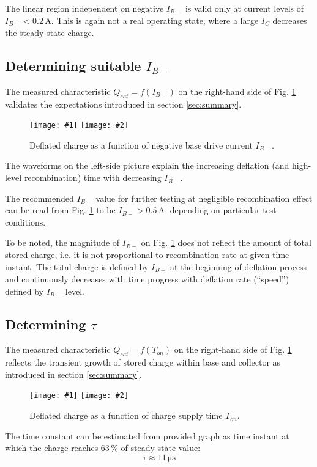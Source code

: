 \documentclass{eeict}
\newcommand{\un}[1]{\, \mathrm{#1}}	%
\newcommand{\myfigdual}[4]
{
    \begin{figure}[!ht]
	\centering
	\texttt{[image: \#1]}
	\texttt{[image: \#2]}
	\caption{#3}
	#4
    \end{figure}
}
\begin{document}
The linear region  independent on negative $I_{B-}$ is valid only at current levels of $I_{B+} < 0.2\un{A}$. This is again not a real operating state, where a large $I_C$ decreases the steady state charge. 


\subsection{Determining suitable $I_{B-}$} \label{sec:mer_vsIbneg}

The measured characteristic $Q_{sat} = f(I_{B-})$ on the right-hand side of Fig. \ref{fig:vsIbneg} validates the expectations introduced in section \ref{sec:summary}.

\myfigdual{priebeh_vsIbneg}{QvsIbneg}{Deflated charge as a function of negative base drive current $I_{B-}$.}{\label{fig:vsIbneg}}

The waveforms on the left-side picture explain the increasing deflation (and high-level recombination) time with decreasing $I_{B-}$.

The recommended $I_{B-}$ value for further testing at negligible recombination effect can be read from Fig. \ref{fig:vsIbneg} to be $I_{B-} > 0.5\un{A}$, depending on particular test conditions.

To be noted, the magnitude of $I_{B-}$ on Fig. \ref{fig:vsIbneg} does not reflect the amount of total stored charge, i.e. it is not proportional to recombination rate at given time instant. The total charge is defined by $I_{B+}$ at the beginning of deflation process and continuously decreases with time progress with deflation rate (``speed'') defined by $I_{B-}$ level.


\subsection{Determining $\tau$} \label{sec:mer_vsTon}

The measured characteristic $Q_{sat} = f(T_{on})$ on the right-hand side of Fig. \ref{fig:vsIbneg} reflects the transient growth of stored charge within base and collector as introduced in section \ref{sec:summary}.
\myfigdual{priebeh_vsTon}{QvsTon}{Deflated charge as a function of charge supply time $T_{on}$.}{\label{fig:vsTon}}

The time constant can be estimated from provided graph as time instant at which the charge reaches $63\un{\%}$ of steady state value:
\begin{equation}
    \tau \approx 11 \un{\mu s}
    \label{eq:tau_result1}
\end{equation}
\end{document}
